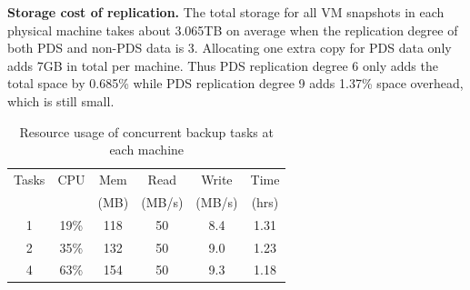 {\bf Storage cost of replication.} 
The total storage  for all VM snapshots in each physical machine takes about 3.065TB on average when
the replication degree of both PDS and non-PDS data is 3. 
Allocating  one extra  copy for PDS data only adds  7GB in total per machine.
Thus PDS replication degree 6 only adds the total space by 0.685\% while PDS replication degree 9 adds 1.37\% 
space overhead, which is still small.

\begin{table}
    \begin{tabular}{|c|c|c|c|c|c|}
    \hline
    Tasks & CPU & Mem &Read &  Write  & Time  \\ 
    & & (MB)          &(MB/s) &  (MB/s) & (hrs) \\ \hline
    1     & 19\% & 118 & 50 & 8.4 & 1.31\\ \hline
    2     & 35\% & 132 &50  & 9.0 & 1.23\\ \hline
    4     & 63\% & 154&50   & 9.3 & 1.18\\ \hline
    \end{tabular}
\caption{Resource usage of concurrent backup tasks at each machine}
\label{tab:resource_usage}
\end{table}

